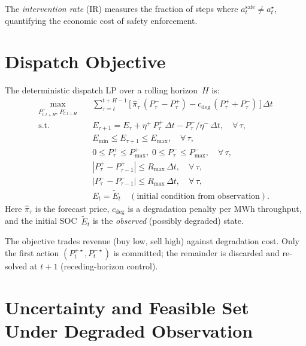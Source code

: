 The \emph{intervention rate} (IR) measures the fraction of steps where
$a_t^{\mathrm{safe}} \neq a_t^\star$, quantifying the economic cost of
safety enforcement.

\section{Dispatch Objective}
\label{sec:dispatch-objective}

The deterministic dispatch LP over a rolling horizon~$H$ is:
\begin{equation}
\label{eq:dispatch-lp}
\begin{aligned}
  \max_{P_{t:t+H}^{+},\, P_{t:t+H}^{-}} \quad &
    \sum_{\tau=t}^{t+H-1}
    \bigl[\,\hat{\pi}_\tau\,(P_\tau^{-} - P_\tau^{+})
           - c_{\mathrm{deg}}\,(P_\tau^{+} + P_\tau^{-})\,\bigr]\,\Delta t \\
  \text{s.t.} \quad &
    E_{\tau+1} = E_\tau + \eta^{+}\,P_\tau^{+}\,\Delta t
                       - P_\tau^{-}/\eta^{-}\,\Delta t,
      \quad \forall\,\tau, \\
  & E_{\min} \le E_{\tau+1} \le E_{\max},
      \quad \forall\,\tau, \\
  & 0 \le P_\tau^{+} \le P_{\max}^{+},\;
    0 \le P_\tau^{-} \le P_{\max}^{-},
      \quad \forall\,\tau, \\
  & |P_\tau^{+} - P_{\tau-1}^{+}| \le R_{\max}\,\Delta t,
      \quad \forall\,\tau, \\
  & |P_\tau^{-} - P_{\tau-1}^{-}| \le R_{\max}\,\Delta t,
      \quad \forall\,\tau, \\
  & E_t = \tilde{E}_t \quad (\text{initial condition from observation}).
\end{aligned}
\end{equation}
Here $\hat{\pi}_\tau$ is the forecast price, $c_{\mathrm{deg}}$ is a
degradation penalty per MWh throughput, and the initial SOC~$\tilde{E}_t$ is
the \emph{observed} (possibly degraded) state.

The objective trades revenue (buy low, sell high) against degradation cost.
Only the first action $(P_t^{+\star}, P_t^{-\star})$ is committed; the
remainder is discarded and re-solved at $t+1$ (receding-horizon control).

\section{Uncertainty and Feasible Set Under Degraded Observation}

